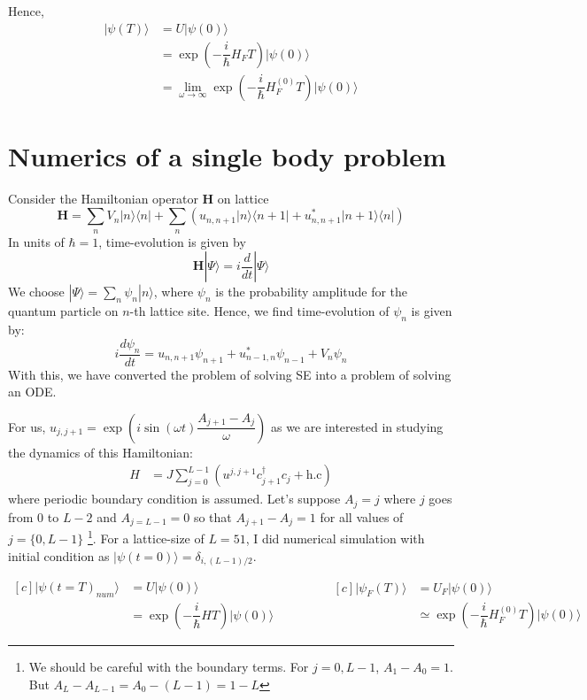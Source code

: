 \documentclass[11pt,a4paper]{article}
\begin{document}
Hence, 
\begin{align*}
|\psi (T) \rangle &= U |\psi (0) \rangle \\
&= \exp(- \dfrac{i}{\hbar}  H_F T)|\psi (0) \rangle \\
&= \lim_{\omega \rightarrow \infty}\exp(- \dfrac{i}{\hbar}  H_F^{(0)}T)|\psi (0) \rangle
\end{align*}


\section{Numerics of a single body problem}

Consider the Hamiltonian operator $\mathbf{H}$ on lattice 
\begin{equation}
\mathbf{H}= \sum_n V_n |n \rangle \langle n| + \sum_n (u_{n,n+1}|n \rangle \langle n+ 1|  + u_{n,n+1}^*|n +1 \rangle \langle n|)
\end{equation}
In units of $\hbar=1$, time-evolution is given by 
\begin{equation}
\mathbf{H} | \Psi \rangle= i\dfrac{d}{dt} | \Psi \rangle
\label{shrod eqn}
\end{equation}
We choose $| \Psi \rangle= \sum_n \psi_n | n \rangle$, where $\psi_n$ is the probability amplitude for the quantum particle on $n$-th lattice site. Hence, we find time-evolution of $\psi_n$ is given by:
\begin{equation}
i\frac{d\psi_n}{dt} =   u_{n,n+1}\psi_{n+1} + u_{n-1,n}^* \psi_{n-1} + V_n \psi_n 
\end{equation}
With this, we have converted the problem of solving SE into a problem of solving an ODE.

For us, $u_{j, j+1}= \exp\left(i \sin(\omega t) \dfrac{A_{j+1}- A_j}{\omega}\right)$ as we are interested in studying the dynamics of this Hamiltonian:
\begin{align*}
H&= J\sum_{j=0}^{L-1}   ( u^{j, j+1} c_{j+1}^{\dagger} c_j + \mbox{h.c}) 
\end{align*}
where periodic boundary condition is assumed. Let's suppose $A_j= j$ where $j$ goes from $0$ to $L-2$ and $A_{j=L-1}= 0$ so that $A_{j+1}- A_j=1$ for all values of $j=\{0,L-1\}$ \footnote{We should be careful with the boundary terms. For $j={0,L-1}$, $A_1-A_0=1$. But $A_{L}-A_{L-1}=A_0- (L-1)=1-L$}. For a lattice-size of $L=51$, I did numerical simulation with initial condition as $| \psi (t=0) \rangle= \delta_{i, (L-1)/2}$.



\begin{equation*}
\begin{aligned}[c]
|\psi (t=T)_{num} \rangle &= U |\psi (0) \rangle \\
&= \exp(- \dfrac{i}{\hbar}  H T)|\psi (0) \rangle 
\end{aligned}
\qquad \qquad
\begin{aligned}[c]
|\psi_F (T) \rangle &= U_F |\psi (0) \rangle \\
&\simeq \exp(- \dfrac{i}{\hbar}  H_F^{(0)}T)|\psi (0) \rangle
\end{aligned}
\end{equation*}
\end{document}
